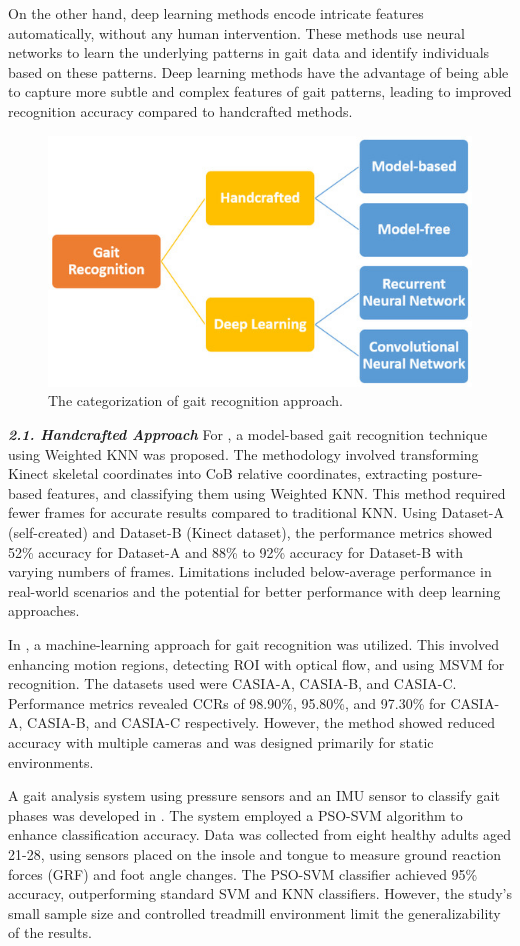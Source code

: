 \documentclass[a4paper]{article}
\begin{document}
On the other hand, deep learning methods encode intricate features automatically,
without any human intervention. These methods use neural networks to learn the underlying patterns in gait data and identify individuals based on these patterns. Deep learning methods have the advantage of being able to capture more subtle and complex features of gait patterns, leading to improved recognition accuracy compared to handcrafted methods.
\begin{figure}[!ht]
\centering
\includegraphics[width=0.53\linewidth]{type-gait.jpg}
\caption{\label{fig:gait}The categorization of gait recognition approach\cite{21}.}
\end{figure}\newline\newline
\textit{\normalsize{\textbf{2.1. Handcrafted Approach}}}\newline
For \cite{6}, a model-based gait recognition technique using Weighted KNN was proposed. The methodology involved transforming Kinect skeletal coordinates into CoB relative coordinates, extracting posture-based features, and classifying them using Weighted KNN. This method required fewer frames for accurate results compared to traditional KNN. Using Dataset-A (self-created) and Dataset-B (Kinect dataset), the performance metrics showed 52\% accuracy for Dataset-A and 88\% to 92\% accuracy for Dataset-B with varying numbers of frames. Limitations included below-average performance in real-world scenarios and the potential for better performance with deep learning approaches.

In \cite{7}, a machine-learning approach for gait recognition was utilized. This involved enhancing motion regions, detecting ROI with optical flow, and using MSVM for recognition. The datasets used were CASIA-A, CASIA-B, and CASIA-C. Performance metrics revealed CCRs of 98.90\%, 95.80\%, and 97.30\% for CASIA-A, CASIA-B, and CASIA-C respectively. However, the method showed reduced accuracy with multiple cameras and was designed primarily for static environments.

A gait analysis system using pressure sensors and an IMU sensor to classify gait phases was developed in \cite{8}. The system employed a PSO-SVM algorithm to enhance classification accuracy. Data was collected from eight healthy adults aged 21-28, using sensors placed on the insole and tongue to measure ground reaction forces (GRF) and foot angle changes. The PSO-SVM classifier achieved 95\% accuracy, outperforming standard SVM and KNN classifiers. However, the study’s small sample size and controlled treadmill environment limit the generalizability of the results.
\end{document}
